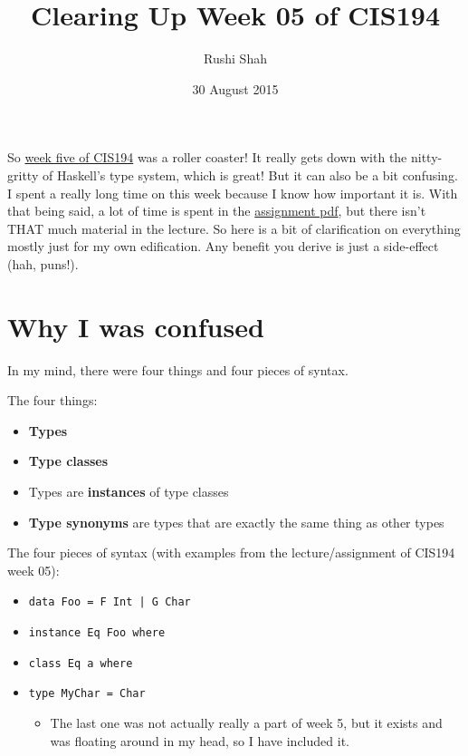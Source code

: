 \documentclass[12pt]{article}
\title{Clearing Up Week 05 of CIS194}
\author{Rushi Shah}
\date{30 August 2015}
\newcommand{\tightlist}{\setlength{\itemsep}{0pt}\setlength{\parskip}{0pt}}
\begin{document}
  \maketitle

So \href{http://www.seas.upenn.edu/~cis194/spring13/lectures/05-type-classes.html}{week
five of CIS194} was a roller coaster! It really gets down with the
nitty-gritty of Haskell's type system, which is great! But it can also
be a bit confusing. I spent a really long time on this week because I
know how important it is. With that being said, a lot of time is spent
in the
\href{http://www.seas.upenn.edu/~cis194/spring13/hw/05-type-classes.pdf}{assignment
pdf}, but there isn't THAT much material in the lecture. So here is a
bit of clarification on everything mostly just for my own edification.
Any benefit you derive is just a side-effect (hah, puns!).

\section{Why I was confused}\label{why-i-was-confused}

In my mind, there were four things and four pieces of syntax.

The four things:

\begin{itemize}
\tightlist
\item
  \textbf{Types}
\item
  \textbf{Type classes}
\item
  Types are \textbf{instances} of type classes
\item
  \textbf{Type synonyms} are types that are exactly the same thing as
  other types
\end{itemize}

The four pieces of syntax (with examples from the lecture/assignment of
CIS194 week 05):

\begin{itemize}
\tightlist
\item
  \texttt{data\ Foo\ =\ F\ Int\ |\ G\ Char}
\item
  \texttt{instance\ Eq\ Foo\ where}
\item
  \texttt{class\ Eq\ a\ where}
\item
  \texttt{type\ MyChar\ =\ Char}
  \begin{itemize}
    \tightlist
    \item
      The last one was not actually really a part of week 5, but it exists and was
      floating around in my head, so I have included it.
  \end{itemize}
\end{itemize}
\end{document}
